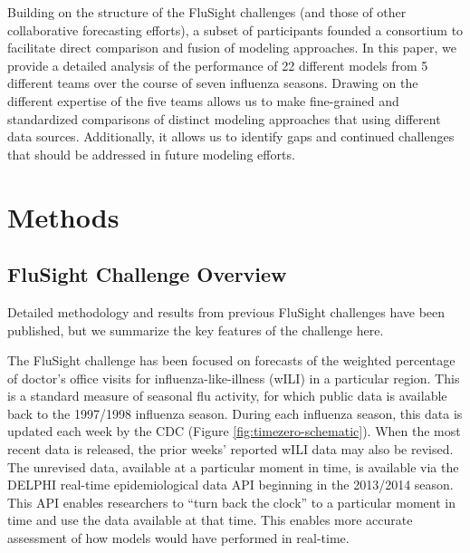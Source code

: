 \documentclass{article}\usepackage[]{graphicx}\usepackage[]{color}
\begin{document}
Building on the structure of the FluSight challenges (and those of other collaborative forecasting efforts\cite{Viboud}), a subset of participants founded a consortium to facilitate direct comparison and fusion of modeling approaches. 
In this paper, we provide a detailed analysis of the performance of 22 different models from 5 different teams over the course of seven influenza seasons.
Drawing on the different expertise of the five teams allows us to make fine-grained and standardized comparisons of distinct modeling approaches that using different data sources.
Additionally, it allows us to identify gaps and continued challenges that should be addressed in future modeling efforts. 





\section{Methods}

\subsection{FluSight Challenge Overview}
 
Detailed methodology and results from previous FluSight challenges have been published\cite{Biggerstaff2016}, but we summarize the key features of the challenge here.

The FluSight challenge has been focused on forecasts of the weighted percentage of doctor's office visits for influenza-like-illness (wILI) in a particular region. This is a standard measure of seasonal flu activity, for which public data is available back to the 1997/1998 influenza season. During each influenza season, this data is updated each week by the CDC (Figure \ref{fig:timezero-schematic}). When the most recent data is released, the prior weeks' reported wILI data may also be revised. The unrevised data, available at a particular moment in time, is available via the DELPHI real-time epidemiological data API beginning in the 2013/2014 season.\cite{DELPHI} This API enables researchers to ``turn back the clock'' to a particular moment in time and use the data available at that time. This enables more accurate assessment of how models would have performed in real-time. 
\end{document}
